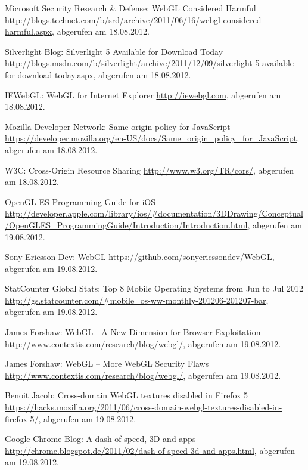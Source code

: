 \begin{thebibliography}{99}
    Microsoft Security Research & Defense: WebGL Considered Harmful
    \url{http://blogs.technet.com/b/srd/archive/2011/06/16/webgl-considered-harmful.aspx}, abgerufen am 18.08.2012.

    Silverlight Blog: Silverlight 5 Available for Download Today
    \url{http://blogs.msdn.com/b/silverlight/archive/2011/12/09/silverlight-5-available-for-download-today.aspx}, abgerufen am 18.08.2012.

    IEWebGL: WebGL for Internet Explorer
    \url{http://iewebgl.com}, abgerufen am 18.08.2012.

    Mozilla Developer Network: Same origin policy for JavaScript
    \url{https://developer.mozilla.org/en-US/docs/Same_origin_policy_for_JavaScript}, abgerufen am 18.08.2012.

    W3C: Cross-Origin Resource Sharing
    \url{http://www.w3.org/TR/cors/}, abgerufen am 18.08.2012.

    OpenGL ES Programming Guide for iOS
    \url{http://developer.apple.com/library/ios/#documentation/3DDrawing/Conceptual/OpenGLES_ProgrammingGuide/Introduction/Introduction.html}, abgerufen am 19.08.2012.
    
    Sony Ericsson Dev: WebGL
    \url{https://github.com/sonyericssondev/WebGL}, abgerufen am 19.08.2012.
  
    StatCounter Global Stats: Top 8 Mobile Operating Systems from Jun to Jul 2012
    \url{http://gs.statcounter.com/#mobile_os-ww-monthly-201206-201207-bar}, abgerufen am 19.08.2012.


    James Forshaw: WebGL - A New Dimension for Browser Exploitation
    \url{http://www.contextis.com/research/blog/webgl/}, abgerufen am 19.08.2012.
    
    James Forshaw: WebGL – More WebGL Security Flaws
    \url{http://www.contextis.com/research/blog/webgl/}, abgerufen am 19.08.2012.

    Benoit Jacob: Cross-domain WebGL textures disabled in Firefox 5
    \url{https://hacks.mozilla.org/2011/06/cross-domain-webgl-textures-disabled-in-firefox-5/}, abgerufen am 19.08.2012.




    Google Chrome Blog: A dash of speed, 3D and apps
    \url{http://chrome.blogspot.de/2011/02/dash-of-speed-3d-and-apps.html}, abgerufen am 19.08.2012.


\end{thebibliography}

